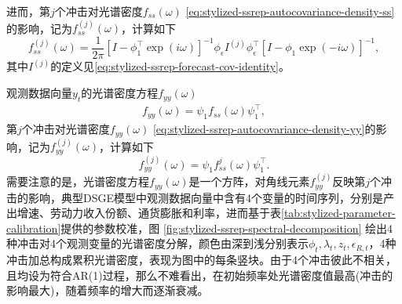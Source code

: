 进而，第$j$个冲击对光谱密度$f_{ss} \left( \omega \right)$ \eqref{eq:stylized-ssrep-autocovariance-density-ss}的影响，记为$f_{ss}^{(j)} \left( \omega \right)$，计算如下
\begin{equation}
  \label{eq:stylized-ssrep-autocovariance-density-ss-j}
  f_{ss}^{(j)} \left( \omega \right) = \frac{1}{2 \pi}
  \left[
  I - \phi_{1}^{\top} \exp \left( i \omega \right)
  \right]^{-1}
  \phi_{\epsilon} I^{(j)} \phi_{\epsilon}^{\top}
  \left[
  I - \phi_{1} \exp \left( - i \omega \right)
  \right]^{-1},
\end{equation}
其中$I^{(j)}$的定义见\eqref{eq:stylized-ssrep-forecast-cov-identity}。

观测数据向量$y_{t}$的光谱密度方程$f_{yy} \left( \omega \right)$
\begin{equation}
  \label{eq:stylized-ssrep-autocovariance-density-yy}
  \begin{split}
    f_{yy} \left( \omega \right)
    = \psi_{1} f_{ss} \left( \omega \right) \psi_{1}^{\top},
  \end{split}
\end{equation}
第$j$个冲击对光谱密度$f_{yy} \left( \omega \right)$ \eqref{eq:stylized-ssrep-autocovariance-density-yy}的影响，记为$f_{yy}^{(j)} \left( \omega \right)$，计算如下
\begin{equation}
  \label{eq:stylized-ssrep-autocovariance-density-yy-j}
  f_{yy}^{(j)} \left( \omega \right)
  = \psi_{1} f_{ss}^{j} \left( \omega \right) \psi_{1}^{\top}.
\end{equation}
需要注意的是，光谱密度方程$f_{yy} \left( \omega \right)$是一个方阵，对角线元素$f_{yy}^{(j)}$反映第$j$个冲击的影响，典型DSGE模型中观测数据向量中含有4个变量的时间序列，分别是产出增速、劳动力收入份额、通货膨胀和利率，进而基于表\ref{tab:stylized-parameter-calibration}提供的参数校准，图  \ref{fig:stylized-ssrep-spectral-decomposition}
绘出4种冲击对4个观测变量的光谱密度分解，颜色由深到浅分别表示$\phi_{t}, \lambda_{t}, z_{t}, \epsilon_{R,t}$，4种冲击加总构成累积光谱密度，表现为图中的每条竖块。由于4个冲击彼此不相关，且均设为符合AR(1)过程，那么不难看出，在初始频率处光谱密度值最高(冲击的影响最大)，随着频率的增大而逐渐衰减。

